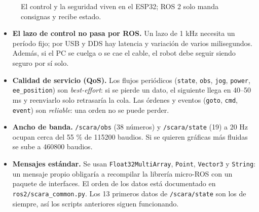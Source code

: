 \documentclass[11pt]{article}
\newcommand{\cod}[1]{\texttt{#1}}
\begin{document}
\begin{figure}[H]\centering
{}
\caption{El control y la seguridad viven en el ESP32; ROS 2 solo manda consignas y recibe estado.}
\end{figure}

\begin{itemize}
  \item \textbf{El lazo de control no pasa por ROS.} Un lazo de 1 kHz necesita un período fijo; por USB y DDS hay latencia y variación de varios milisegundos. Además, si el PC se cuelga o se cae el cable, el robot debe seguir siendo seguro por sí solo.
  \item \textbf{Calidad de servicio (QoS).} Los flujos periódicos (\cod{state}, \cod{obs}, \cod{jog}, \cod{power}, \cod{ee\_position}) son \emph{best-effort}: si se pierde un dato, el siguiente llega en 40--50 ms y reenviarlo solo retrasaría la cola. Las órdenes y eventos (\cod{goto}, \cod{cmd}, \cod{event}) son \emph{reliable}: una orden no se puede perder.
  \item \textbf{Ancho de banda.} \cod{/scara/obs} (38 números) y \cod{/scara/state} (19) a 20 Hz ocupan cerca del 55 \% de 115200 baudios. Si se quieren gráficas más fluidas se sube a 460800 baudios.
  \item \textbf{Mensajes estándar.} Se usan \cod{Float32MultiArray}, \cod{Point}, \cod{Vector3} y \cod{String}: un mensaje propio obligaría a recompilar la librería micro-ROS con un paquete de interfaces. El orden de los datos está documentado en \cod{ros2/scara\_common.py}. Los 13 primeros datos de \cod{/scara/state} son los de siempre, así los scripts anteriores siguen funcionando.
\end{itemize}
\end{document}
